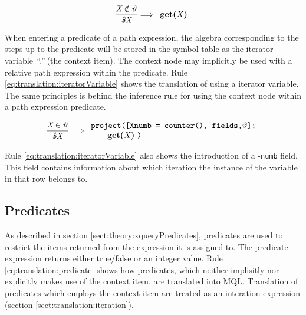 \begin{equation}
\centering
\frac{\displaystyle \textit{X} \notin \vartheta}{\displaystyle \textit{\$X}}
\Longrightarrow
\begin{array}{l}
	\mbox{\textbf{get(}\textit{X}\textbf{)}}
\end{array}
\label{eq:translation:variableNotIterator}
\end{equation}

When entering a predicate of a path expression, the algebra corresponding to
the steps up to the predicate will be stored in the symbol table as the
iterator variable \textit{``.''} (the context item). The context node may
implicitly be used with a relative path expression within the predicate. Rule
\ref{eq:translation:iteratorVariable} shows the translation of using a
iterator variable. The same principles is behind the inference rule for using
the context node within a path expression predicate.

\begin{equation}
\centering
\frac{\displaystyle \textit{X} \in \vartheta}{\displaystyle \textit{\$X}}
\Longrightarrow
\begin{array}{l}
	\mbox{\texttt{project([Xnumb = counter(), fields,}} \vartheta
	\mbox{\texttt{];}}
	\\ \qquad
	\mbox{\textbf{get(}\textit{X}\textbf{)} \texttt{)}}
\end{array}
\label{eq:translation:iteratorVariable}
\end{equation}


Rule \ref{eq:translation:iteratorVariable} also shows the introduction of a
-\verb!numb! field. This field contains information about which iteration the
instance of the variable in that row belongs to.

\subsection{Predicates}
As described in section \ref{sect:theory:xqueryPredicates}, predicates are used
to restrict the items returned from the expression it is assigned to. The
predicate expression returns either true/false or an integer value. Rule
\ref{eq:translation:predicate} shows how predicates, which neither implisitly
nor explicitly makes use of the context item, are translated into MQL.
Translation of predicates which employs the context item are treated as an
interation expression (section \ref{sect:translation:iteration}).

